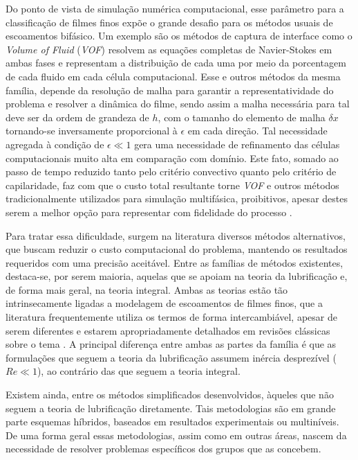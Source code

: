 Do ponto de vista de simulação numérica computacional, esse parâmetro para a classificação de filmes finos expõe o grande desafio para os métodos usuais de escoamentos bifásico. Um exemplo são os métodos de captura de interface como o \textit{Volume of Fluid} (\textit{VOF}) \citep{Hirt1981} resolvem as equações completas de Navier-Stokes em ambas fases e representam a distribuição de cada uma por meio da porcentagem de cada fluido em cada célula computacional. Esse e outros métodos da mesma família, depende da resolução de malha para garantir a representatividade do problema e resolver a dinâmica do filme, sendo assim a malha necessária para tal deve ser da ordem de grandeza de $h$, com o tamanho do elemento de malha $\delta x$ tornando-se inversamente proporcional à $\epsilon$ em cada direção. Tal necessidade agregada à condição de $\epsilon \ll 1$ gera uma necessidade de refinamento das células computacionais muito alta em comparação com domínio. Este fato, somado ao passo de tempo reduzido tanto pelo critério convectivo quanto pelo critério de capilaridade, faz com que o custo total resultante torne \textit{VOF} e outros métodos tradicionalmente utilizados para simulação multifásica, proibitivos, apesar destes serem a melhor opção para representar com fidelidade do processo \citep{Kakimpa2015, Kakimpa2016}.

Para tratar essa dificuldade, surgem na literatura diversos métodos alternativos, que buscam reduzir o custo computacional do problema, mantendo os resultados requeridos com uma precisão aceitável. Entre as famílias de métodos existentes, destaca-se, por serem maioria, aquelas que se apoiam na teoria da lubrificação e, de forma mais geral, na teoria integral. Ambas as teorias estão tão intrinsecamente ligadas a modelagem de escoamentos de filmes finos, que a literatura frequentemente utiliza os termos de forma intercambiável, apesar de serem diferentes e estarem apropriadamente detalhados em revisões clássicas sobre o tema \citep{Oron1997,Craster2009}. A principal diferença entre ambas as partes da família é que as formulações que seguem a teoria da lubrificação assumem inércia desprezível ($Re \ll 1$), ao contrário das que seguem a teoria integral.

Existem ainda, entre os métodos simplificados desenvolvidos, àqueles que não seguem a teoria de lubrificação diretamente. Tais metodologias são em grande parte esquemas híbridos, baseados em resultados experimentais ou multiníveis. De uma forma geral essas metodologias, assim como em outras áreas, nascem da necessidade de resolver problemas específicos dos grupos que as concebem. 

